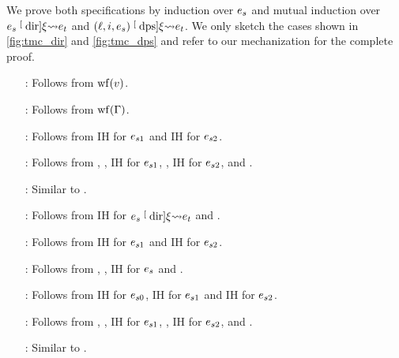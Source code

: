 \begin{myproof}
    We prove both specifications by induction over $\datalangExpr_s$ and mutual induction over $\datalangExpr_s \tmcDir{\datalangRenaming} \datalangExpr_t$ and $(\datalangLoc, \datalangIdx, \datalangExpr_s) \tmcDps{\datalangRenaming} \datalangExpr_t$.
    We only sketch the cases shown in \cref{fig:tmc_dir} and \cref{fig:tmc_dps} and refer to our mechanization for the complete proof.
    \begin{itemize}[align=left, leftmargin=*]
        \item[\RefTirName{DirVal}:] Follows from $\wf{\datalangVal}$.
        \item[\RefTirName{DirVar}:] Follows from $\wf{\datalangBisubst}$.
        \item[\RefTirName{DirLet}:] Follows from IH for $\datalangExpr_{s1}$ and IH for $\datalangExpr_{s2}$.
        \item[\RefTirName{DirBlockDPS1}:] Follows from , , IH for $\datalangExpr_{s1}$, , IH for $\datalangExpr_{s2}$,  and .
        \item[\RefTirName{DirBlockDPS2}:] Similar to .
        \item[\RefTirName{DPSBase}:] Follows from IH for $\datalangExpr_s \tmcDir{\datalangRenaming} \datalangExpr_t$ and .
        \item[\RefTirName{DPSLet}:] Follows from IH for $\datalangExpr_{s1}$ and IH for $\datalangExpr_{s2}$.
        \item[\RefTirName{DPSCall}:] Follows from , , IH for $\datalangExpr_s$ and .
        \item[\RefTirName{DPSIf}:] Follows from IH for $\datalangExpr_{s0}$, IH for $\datalangExpr_{s1}$ and IH for $\datalangExpr_{s2}$.
        \item[\RefTirName{DPSBlock1}:] Follows from , , IH for $\datalangExpr_{s1}$, ,  IH for $\datalangExpr_{s2}$,  and .
        \item[\RefTirName{DPSBlock2}:] Similar to . \qedhere
    \end{itemize}
\end{myproof}




